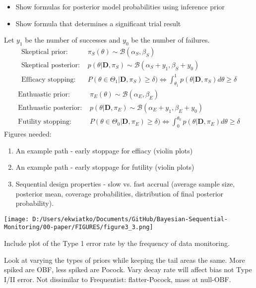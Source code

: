 \documentclass[12pt]{article}
\begin{document}
\begin{itemize}
\item Show formulas for posterior model probabilities using inference prior
\item Show formula that determines a significant trial result
\end{itemize}
Let $y_1$ be the number of successes and $y_0$ be the number of failures.
\begin{align*}
\text{Skeptical prior: }&\pi_S(\theta)\sim\mathcal{B}(\alpha_S,\beta_S)\\
\text{Skeptical posterior: }&p(\theta|\mathbf{D},\pi_S)\sim\mathcal{B}(\alpha_S+y_1,\beta_S+y_0)\\
\text{Efficacy stopping: }&P(\theta\in\Theta_1|\mathbf{D}, \pi_{S})\geq\delta)\Longleftrightarrow\int_{\theta_1}^{1}p(\theta|\mathbf{D},\pi_S)d\theta\geq\delta
\end{align*}
\begin{align*}
\text{Enthuastic prior: }&\pi_E(\theta)\sim\mathcal{B}(\alpha_E,\beta_E)\\
\text{Enthuastic posterior: }&p(\theta|\mathbf{D},\pi_E)\sim\mathcal{B}(\alpha_E+y_1,\beta_E+y_0)\\
\text{Futility stopping: } &P(\theta\in\Theta_0|\mathbf{D}, \pi_{E})\geq\delta)\Longleftrightarrow\int_{0}^{\theta_0}p(\theta|\mathbf{D},\pi_E)d\theta\geq\delta
\end{align*}
Figures needed:
\begin{enumerate}
\item An example path - early stoppage for effiacy (violin plots)
\item An example path - early stoppage for futility (violin plots)
\item Sequential design properties - slow vs. fast accrual (average sample size, posterior mean, coverage probabilities, distribution of final posterior probability).
\end{enumerate}
\begin{center}
\texttt{[image: D:/Users/ekwiatko/Documents/GitHub/Bayesian-Sequential-Monitoring/00-paper/FIGURES/figure3\_3.png]}
\end{center}
Include plot of the Type 1 error rate by the frequency of data monitoring.

Look at varying the types of priors while keeping the tail areas the same. More spiked are OBF, less spiked are Pocock.
Vary decay rate will affect bias not Type I/II error. Not dissimilar to Frequentist: flatter-Pocock, mass at null-OBF.
\end{document}
